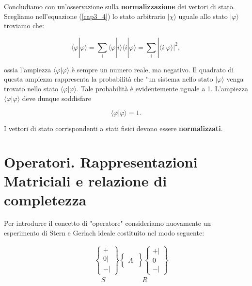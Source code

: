 Concludiamo con un'osservazione sulla \textbf{normalizzazione} dei vettori di stato. Scegliamo nell'equazione (\ref{cap3_4}) lo stato arbitrario $| \chi \rangle$ uguale allo stato $| \varphi \rangle$ troviamo che:

\begin{equation}
\langle \varphi | \varphi \rangle = \sum \limits_{i} \langle \varphi | i \rangle \langle i | \varphi \rangle = \sum \limits_{i} |\langle i | \varphi \rangle |^2 ,
\end{equation}

ossia l'ampiezza $\langle \varphi| \varphi \rangle$ è sempre un numero reale, ma negativo. Il quadrato di questa ampiezza rappresenta la probabilità che "un sistema nello stato $| \varphi \rangle$ venga trovato nello stato $\langle \varphi | \varphi \rangle $. Tale probabilità è evidentemente uguale a 1. L'ampiezza $\langle \varphi| \varphi \rangle$ deve dunque soddisfare

\begin{equation}
\langle \varphi| \varphi \rangle =1 .
\end{equation}

I vettori di stato corrispondenti a stati fisici devono essere \textbf{normalizzati}.

\section[Operatori]{Operatori. Rappresentazioni Matriciali e relazione di completezza}

Per introdurre il concetto di "operatore" consideriamo nuovamente un esperimento di Stern e Gerlach ideale costituito nel modo seguente:

\begin{eqnarray}
& &\begin{Bmatrix}
 + \\ 0 | \\ - |  
\end{Bmatrix}
\begin{Bmatrix}
\quad \\  A  \\ \quad
\end{Bmatrix}
\begin{Bmatrix}
 +| \\ 0  \\ - |  
\end{Bmatrix}\\
& & \quad S  \ \qquad \quad\ \qquad R \nonumber
\end{eqnarray}

